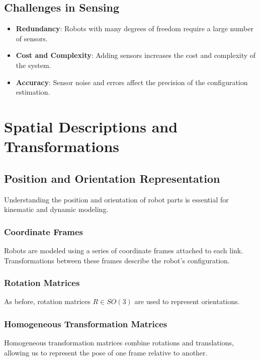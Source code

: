 \documentclass{article}
\begin{document}
\subsection{Challenges in Sensing}

\begin{itemize}
    \item \textbf{Redundancy}: Robots with many degrees of freedom require a large number of sensors.
    \item \textbf{Cost and Complexity}: Adding sensors increases the cost and complexity of the system.
    \item \textbf{Accuracy}: Sensor noise and errors affect the precision of the configuration estimation.
\end{itemize}

\section{Spatial Descriptions and Transformations}

\subsection{Position and Orientation Representation}

Understanding the position and orientation of robot parts is essential for kinematic and dynamic modeling.

\subsubsection{Coordinate Frames}

Robots are modeled using a series of coordinate frames attached to each link. Transformations between these frames describe the robot's configuration.

\subsubsection{Rotation Matrices}

As before, rotation matrices $R \in SO(3)$ are used to represent orientations.

\subsubsection{Homogeneous Transformation Matrices}

Homogeneous transformation matrices combine rotations and translations, allowing us to represent the pose of one frame relative to another.
\end{document}
